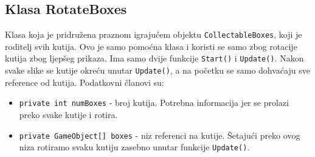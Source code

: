 \subsection{Klasa RotateBoxes}
Klasa koja je pridružena praznom igrajućem objektu \texttt{CollectableBoxes}, koji je roditelj svih kutija. Ovo je samo pomoćna klasa i koristi se samo zbog rotacije kutija zbog ljepšeg prikaza. Ima samo dvije funkcije \texttt{Start()} i \texttt{Update()}. Nakon svake slike se kutije okreću unutar \texttt{Update()}, a na početku se samo dohvaćaju sve reference od kutija. Podatkovni članovi su:
\begin{itemize}
	\item \texttt{private int numBoxes} - broj kutija. Potrebna informacija jer se prolazi preko svake kutije i rotira.
	\item \texttt{private GameObject[] boxes} - niz referenci na kutije. Šetajući preko ovog niza rotiramo svaku kutiju zasebno unutar funkcije \newline \texttt{Update()}.
\end{itemize}